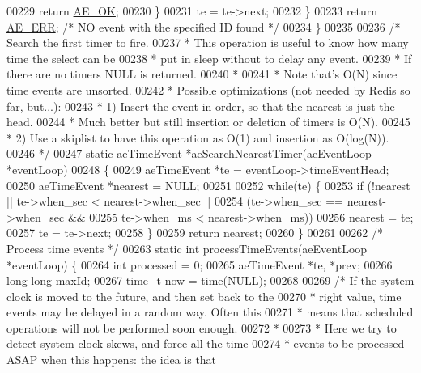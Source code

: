 \begin{DoxyCode}
00229             \textcolor{keywordflow}{return} \hyperlink{ae_8h_afaac43d9573452f9fc6c718f90c4c645}{AE\_OK};
00230         \}
00231         te = te->next;
00232     \}
00233     \textcolor{keywordflow}{return} \hyperlink{ae_8h_aa16dcf7effdf8f8df97f51b1cb51a9df}{AE\_ERR}; \textcolor{comment}{/* NO event with the specified ID found */}
00234 \}
00235 
00236 \textcolor{comment}{/* Search the first timer to fire.}
00237 \textcolor{comment}{ * This operation is useful to know how many time the select can be}
00238 \textcolor{comment}{ * put in sleep without to delay any event.}
00239 \textcolor{comment}{ * If there are no timers NULL is returned.}
00240 \textcolor{comment}{ *}
00241 \textcolor{comment}{ * Note that's O(N) since time events are unsorted.}
00242 \textcolor{comment}{ * Possible optimizations (not needed by Redis so far, but...):}
00243 \textcolor{comment}{ * 1) Insert the event in order, so that the nearest is just the head.}
00244 \textcolor{comment}{ *    Much better but still insertion or deletion of timers is O(N).}
00245 \textcolor{comment}{ * 2) Use a skiplist to have this operation as O(1) and insertion as O(log(N)).}
00246 \textcolor{comment}{ */}
00247 \textcolor{keyword}{static} aeTimeEvent *aeSearchNearestTimer(aeEventLoop *eventLoop)
00248 \{
00249     aeTimeEvent *te = eventLoop->timeEventHead;
00250     aeTimeEvent *nearest = NULL;
00251 
00252     \textcolor{keywordflow}{while}(te) \{
00253         \textcolor{keywordflow}{if} (!nearest || te->when\_sec < nearest->when\_sec ||
00254                 (te->when\_sec == nearest->when\_sec &&
00255                  te->when\_ms < nearest->when\_ms))
00256             nearest = te;
00257         te = te->next;
00258     \}
00259     \textcolor{keywordflow}{return} nearest;
00260 \}
00261 
00262 \textcolor{comment}{/* Process time events */}
00263 \textcolor{keyword}{static} \textcolor{keywordtype}{int} processTimeEvents(aeEventLoop *eventLoop) \{
00264     \textcolor{keywordtype}{int} processed = 0;
00265     aeTimeEvent *te, *prev;
00266     \textcolor{keywordtype}{long} \textcolor{keywordtype}{long} maxId;
00267     time\_t now = time(NULL);
00268 
00269     \textcolor{comment}{/* If the system clock is moved to the future, and then set back to the}
00270 \textcolor{comment}{     * right value, time events may be delayed in a random way. Often this}
00271 \textcolor{comment}{     * means that scheduled operations will not be performed soon enough.}
00272 \textcolor{comment}{     *}
00273 \textcolor{comment}{     * Here we try to detect system clock skews, and force all the time}
00274 \textcolor{comment}{     * events to be processed ASAP when this happens: the idea is that}

\end{DoxyCode}
